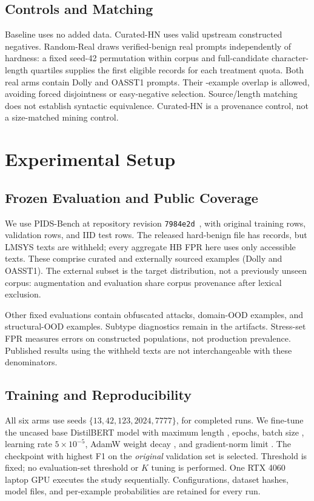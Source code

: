 \documentclass[conference]{IEEEtran}
\begin{document}
\subsection{Controls and Matching}
Baseline uses no added data. Curated-HN uses \NCurAug{} valid upstream constructed negatives. Random-Real draws \PrimaryK{} verified-benign real prompts independently of hardness: a fixed seed-42 permutation within corpus and full-candidate character-length quartiles supplies the first eligible records for each treatment quota. Both real arms contain \NDollySelected{} Dolly and \NOasstSelected{} OASST1 prompts. Their \NOverlap{}-example overlap is allowed, avoiding forced disjointness or easy-negative selection. Source/length matching does not establish syntactic equivalence. Curated-HN is a provenance control, not a size-matched mining control.

\section{Experimental Setup}
\subsection{Frozen Evaluation and Public Coverage}
We use PIDS-Bench at repository revision \texttt{7984e2d}~\cite{pidsrepo}, with \NTrain{} original training rows, \NVal{} validation rows, and \NIID{} IID test rows. The released hard-benign file has \NReleasedHB{} records, but \NWithheld{} LMSYS texts are withheld; every aggregate HB FPR here uses only \NHB{} accessible texts. These comprise \NCuratedHB{} curated and \NExternal{} externally sourced examples (Dolly and OASST1). The external subset is the target distribution, not a previously unseen corpus: augmentation and evaluation share corpus provenance after lexical exclusion.

Other fixed evaluations contain \NObf{} obfuscated attacks, \NDomain{} domain-OOD examples, and \NStruct{} structural-OOD examples. Subtype diagnostics remain in the artifacts. Stress-set FPR measures errors on constructed populations, not production prevalence. Published results using the withheld texts are not interchangeable with these denominators.

\subsection{Training and Reproducibility}
All six arms use seeds $\{13,42,123,2024,7777\}$, for \NRuns{} completed runs. We fine-tune the uncased base DistilBERT model with maximum length \MaxLength, \NEpochs{} epochs, batch size \NBatch, learning rate $5\times10^{-5}$, AdamW weight decay \WeightDecay, and gradient-norm limit \MaxGradNorm. The checkpoint with highest F1 on the \emph{original} validation set is selected. Threshold \Threshold{} is fixed; no evaluation-set threshold or $K$ tuning is performed. One RTX 4060 laptop GPU executes the study sequentially. Configurations, dataset hashes, model files, and per-example probabilities are retained for every run.
\end{document}
